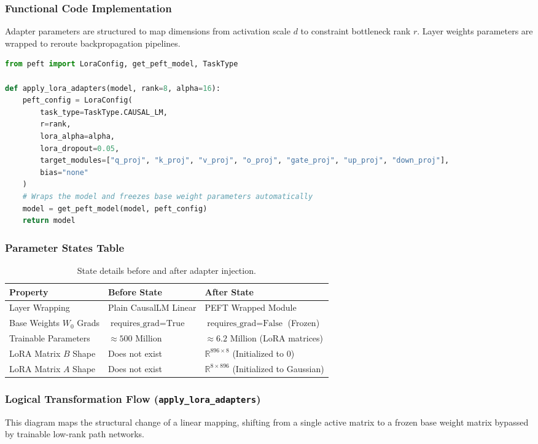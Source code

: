 \documentclass{article}
\begin{document}
\subsubsection{Functional Code Implementation}
Adapter parameters are structured to map dimensions from activation scale $d$ to constraint bottleneck rank $r$. Layer weights parameters are wrapped to reroute backpropagation pipelines.

\begin{lstlisting}[language=Python]
from peft import LoraConfig, get_peft_model, TaskType

def apply_lora_adapters(model, rank=8, alpha=16):
    peft_config = LoraConfig(
        task_type=TaskType.CAUSAL_LM,
        r=rank,
        lora_alpha=alpha,
        lora_dropout=0.05,
        target_modules=["q_proj", "k_proj", "v_proj", "o_proj", "gate_proj", "up_proj", "down_proj"],
        bias="none"
    )
    # Wraps the model and freezes base weight parameters automatically
    model = get_peft_model(model, peft_config)
    return model
\end{lstlisting}

\subsubsection{Parameter States Table}
\begin{table}[h]
\centering
\begin{tabular}{lll}
\toprule
\textbf{Property} & \textbf{Before State} & \textbf{After State} \\
\midrule
Layer Wrapping & Plain CausalLM Linear & PEFT Wrapped Module \\
Base Weights $W_0$ Grads & $\text{requires\_grad} = \text{True}$ & $\text{requires\_grad} = \text{False}$ (Frozen) \\
Trainable Parameters & $\approx 500$ Million & $\approx 6.2$ Million (LoRA matrices) \\
LoRA Matrix $B$ Shape & Does not exist & $\mathbb{R}^{896 \times 8}$ (Initialized to $0$) \\
LoRA Matrix $A$ Shape & Does not exist & $\mathbb{R}^{8 \times 896}$ (Initialized to Gaussian) \\
\bottomrule
\end{tabular}
\caption{State details before and after adapter injection.}
\end{table}

\newpage
\subsubsection{Logical Transformation Flow (\texttt{apply\_lora\_adapters})}
This diagram maps the structural change of a linear mapping, shifting from a single active matrix to a frozen base weight matrix bypassed by trainable low-rank path networks.
\end{document}
